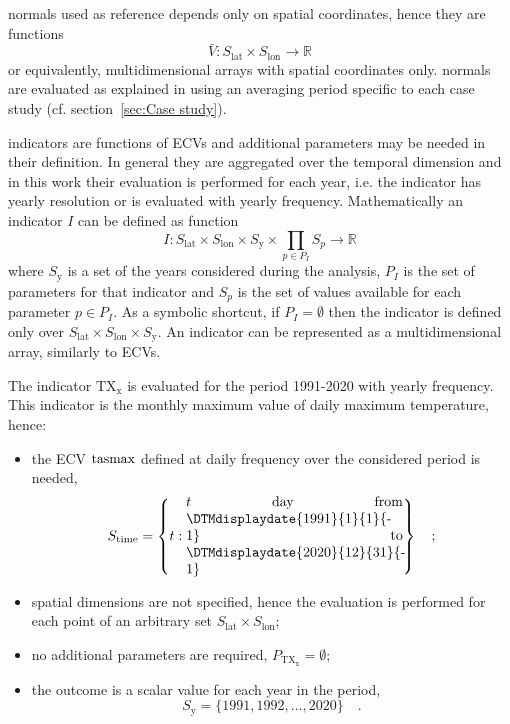 \Glspl{normal} used as reference depends only on spatial coordinates, hence they are functions
\begin{equation}
  \label{eq:math_normal}
  \bar{V} : S_\text{lat} \times S_\text{lon} \to \mathbb{R}
\end{equation}
or equivalently, multidimensional arrays with spatial coordinates only.
\Glspl{normal} are evaluated as explained in \cite[6]{2017WorldMeteorologicalOrganizationWMOWMOGuidelines} using an averaging period specific to each case study (cf. section~\ref{sec:Case study}).

\Glspl{indicator} are functions of \glspl{ECV} and additional parameters may be needed in their definition. In general they are aggregated over the temporal dimension and in this work their evaluation is performed for each year, i.e. the \gls{indicator} has yearly resolution or is evaluated with yearly frequency.
Mathematically an \gls{indicator} $I$ can be defined as function
\begin{equation}
  \label{eq:math_indicator}
  I : S_\text{lat} \times S_\text{lon} \times S_\text{y} \times \prod_{p \in P_I} S_p \to \mathbb{R}
\end{equation}
where $S_\text{y}$ is a set of the years considered during the analysis, $P_I$ is the set of parameters for that indicator and $S_p$ is the set of values available for each parameter $p \in P_I$. As a symbolic shortcut, if $P_I = \emptyset$ then the indicator is defined only over $S_\text{lat} \times S_\text{lon} \times S_\text{y}$.
An indicator can be represented as a multidimensional array, similarly to \glspl{ECV}.

\begin{example}
  The \gls{indicator} $\mathrm{TX_x}$ is evaluated for the period 1991-2020 with yearly frequency. This \gls{indicator} is the monthly maximum value of daily maximum temperature,\cite{ETCCDIClimate} hence:
  \begin{itemize}
    \item the \gls{ECV} $\mathrm{tasmax}$ defined at daily frequency over the considered period is needed,
      \begin{equation*}
        S_\text{time} = \left\{ t : \parbox{0.45\linewidth}{$t$ day from \DTMdisplaydate{1991}{1}{1}{-1} to \DTMdisplaydate{2020}{12}{31}{-1}} \right\}
        \quad ;
      \end{equation*}
    \item spatial dimensions are not specified, hence the evaluation is performed for each point of an arbitrary set $S_\text{lat} \times S_\text{lon}$;
    \item no additional parameters are required, $P_\mathrm{TX_x} = \emptyset$;
    \item the outcome is a scalar value for each year in the period,
      \begin{equation*}
        S_\text{y} = \{ 1991, 1992, \dots, 2020 \}
        \quad .
      \end{equation*}
  \end{itemize}
\end{example}
